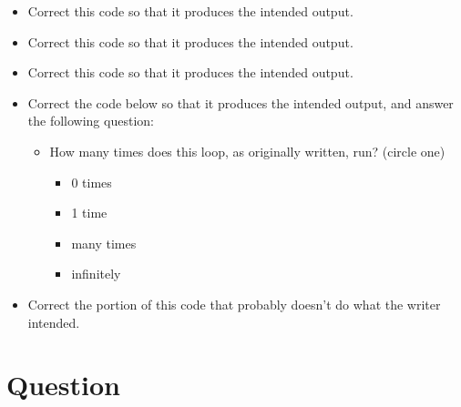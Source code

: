 \vspace{1.5ex}
\begin{itemize}

    \filbreak
  \item Correct this code so that it produces the intended output.
    \vspace{3ex}

    \filbreak
  \item Correct this code so that it produces the intended output.
    \vspace{3ex}

    \filbreak
  \item Correct this code so that it produces the intended output.
    \vspace{3ex}

    \filbreak
  \item Correct the code below so that it produces the intended output, and
    answer the following question:
    \begin{itemize}
      \item How many times does this loop, as originally written, run? (circle
        one)
        \begin{itemize}
          \item 0 times
          \item 1 time
          \item many times
          \item infinitely
        \end{itemize}
    \end{itemize}
    \vspace{3ex}
    \newpage

    \filbreak
  \item Correct the portion of this code that probably doesn't do what the
    writer intended.
    \vspace{3ex}

\end{itemize}


\newpage

\section{Question}

